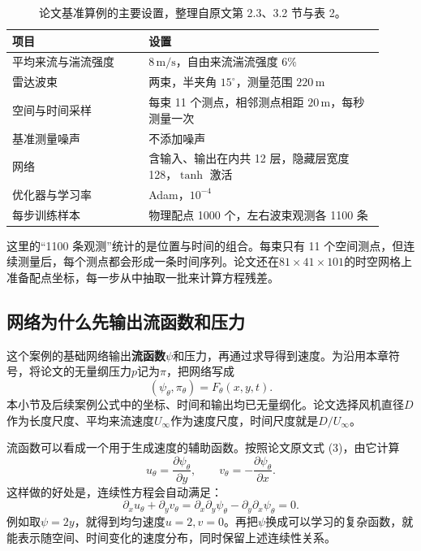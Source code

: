 \begin{table}[htbp]
\centering\small
\caption{论文基准算例的主要设置，整理自原文第 2.3、3.2 节与表 2\cite{zhang2021spatiotemporal}。}
\label{tab:pinn-zhang-setup}
\begin{tabular}{p{0.33\linewidth}p{0.58\linewidth}}
\toprule
项目 & 设置\\
\midrule
平均来流与湍流强度 & $8\,\mathrm{m/s}$，自由来流湍流强度 $6\%$\\
雷达波束 & 两束，半夹角 $15^\circ$，测量范围 $220\,\mathrm{m}$\\
空间与时间采样 & 每束 11 个测点，相邻测点相距 $20\,\mathrm{m}$，每秒测量一次\\
基准测量噪声 & 不添加噪声\\
网络 & 含输入、输出在内共 12 层，隐藏层宽度 128，$\tanh$ 激活\\
优化器与学习率 & Adam，$10^{-4}$\\
每步训练样本 & 物理配点 1000 个，左右波束观测各 1100 条\\
\bottomrule
\end{tabular}
\end{table}

这里的“1100 条观测”统计的是位置与时间的组合。每束只有 11 个空间测点，但连续测量后，每个测点都会形成一条时间序列。论文还在$81\times41\times101$的时空网格上准备配点坐标，每一步从中抽取一批来计算方程残差。

\subsection{网络为什么先输出流函数和压力}
这个案例的基础网络输出\textbf{流函数}$\psi$和压力，再通过求导得到速度。为沿用本章符号，将论文的无量纲压力$p$记为$\pi$，把网络写成
\begin{equation}
 (\psi_\theta,\pi_\theta)=F_\theta(x,y,t).
 \label{eq:pinn-zhang-network}
\end{equation}
本小节及后续案例公式中的坐标、时间和输出均已无量纲化。论文选择风机直径$D$作为长度尺度、平均来流速度$U_\infty$作为速度尺度，时间尺度就是$D/U_\infty$。

流函数可以看成一个用于生成速度的辅助函数。按照论文原文式 (3)，由它计算
\begin{equation}
 u_\theta=\frac{\partial\psi_\theta}{\partial y},\qquad
 v_\theta=-\frac{\partial\psi_\theta}{\partial x}.
 \label{eq:pinn-zhang-streamfunction}
\end{equation}
这样做的好处是，连续性方程会自动满足：
\[
 \partial_xu_\theta+\partial_yv_\theta
 =\partial_x\partial_y\psi_\theta-\partial_y\partial_x\psi_\theta=0.
\]
例如取$\psi=2y$，就得到均匀速度$u=2,v=0$。再把$\psi$换成可以学习的复杂函数，就能表示随空间、时间变化的速度分布，同时保留上述连续性关系。

